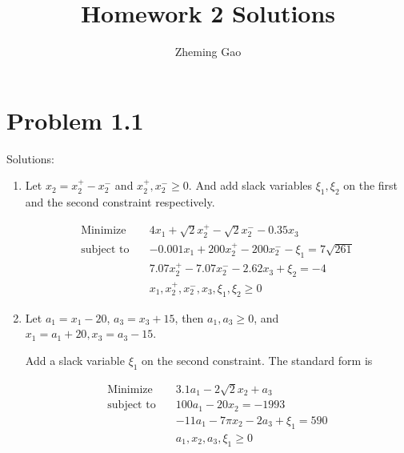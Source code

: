 \documentclass[12pt]{article}
\begin{document}
 
 
\title{Homework 2 Solutions}
\author{Zheming Gao}
\maketitle

\section*{Problem 1.1}

Solutions: 
\begin{enumerate}
\item 

Let $x_2 = x_2^+ - x_2^-$ and $x_2 ^+, x_2^- \geqslant 0$.
And add slack variables $\xi_1, \xi_2$ on the first and the second constraint respectively.

\begin{equation*}
\begin{aligned}
\text{Minimize} \quad & 4x_1 + \sqrt{2}x_2^+ - \sqrt{2}x_2^- - 0.35 x_3 \\
\text{subject\  to} \quad & -0.001x_1 + 200 x_2^+ - 200 x_2^- - \xi_1 = 7\sqrt{261} \\
& 7.07 x_2^+ - 7.07 x_2^- - 2.62 x_3 + \xi_2 = -4 \\
& x_1, x_2^+, x_2^-, x_3, \xi_1, \xi_2 \geqslant 0
\end{aligned}
\end{equation*}

\item

Let $a_1 = x_1 - 20$, $a_3 = x_3 + 15$, then $a_1, a_3 \geqslant 0$, and $x_1 = a_1 + 20, x_3 = a_3 - 15$.

Add a slack variable $\xi_1$ on the second constraint. The standard form is

\begin{equation*}
\begin{aligned}
\text{Minimize} \quad & 3.1a_1 - 2\sqrt{2}x_2 + a_3 \\
\text{subject\  to} \quad & 100a_1 - 20 x_2 = -1993 \\
& -11a_1 - 7\pi x_2 - 2a_3 + \xi_1 = 590\\
& a_1, x_2, a_3, \xi_1 \geqslant 0
\end{aligned}
\end{equation*}


\end{enumerate}
\end{document}
